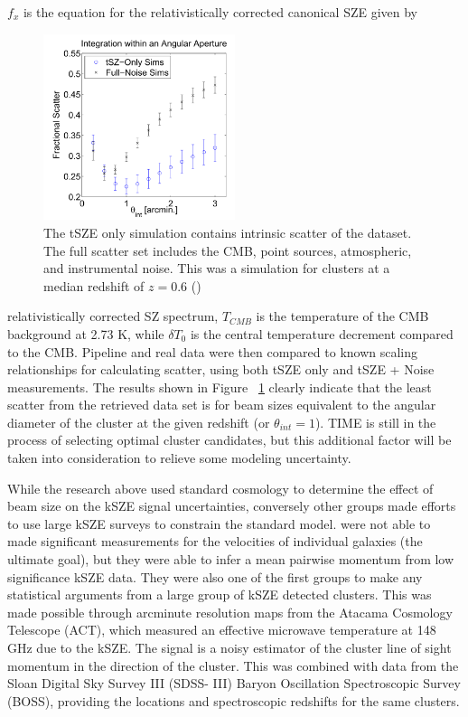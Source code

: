\documentclass[manuscript]{aastex}
\begin{document}
$f_{x}$ is the equation for the relativistically corrected canonical SZE given by 
\begin{figure}
\vspace{-0.8cm}
  \begin{center}
    \includegraphics[width=0.5\textwidth]{saliwanchick1.png}
   \end{center}
\caption[MCMC Cluster Simulation Showing Scatter Versus Integration Angle -(\cite{Saliwanchik2015})]{The tSZE only simulation contains intrinsic scatter of the dataset. The full scatter set includes the CMB, point sources, atmospheric, and instrumental noise. This was a simulation for clusters at a median redshift of $z = 0.6$ (\cite{Saliwanchik2015})}
\label{fig:sali1}
\end{figure}
relativistically corrected SZ spectrum, $T_{CMB}$ is the temperature of the CMB background at 2.73 K, while $\delta T_{0}$ is the central temperature decrement compared to the CMB. Pipeline and real data were then compared to known scaling relationships for calculating scatter, using both tSZE only and tSZE + Noise measurements. The results shown in Figure ~\ref{fig:sali1} clearly indicate that the least scatter from the retrieved data set is for beam sizes equivalent to the angular diameter of the cluster at the given redshift (or \(\theta_{int} = 1\)). TIME is still in the process of selecting optimal cluster candidates, but this additional factor will be taken into consideration to relieve some modeling uncertainty.  

While the research above used standard cosmology to determine the effect of beam size on the kSZE signal uncertainties, conversely other groups made efforts to use large kSZE surveys to constrain the standard model. \cite{Hand2012} were not able to made significant measurements for the velocities of individual galaxies (the ultimate goal), but they were able to infer a mean pairwise momentum from low significance kSZE data. They were also one of the first groups to make any statistical arguments from a large group of kSZE detected clusters. This was made possible through arcminute resolution maps from the Atacama Cosmology Telescope (ACT), which measured an effective microwave temperature at 148 GHz due to the kSZE. The signal is a noisy estimator of the cluster line of sight momentum in the direction of the cluster. This was combined with data from the Sloan Digital Sky Survey III (SDSS- III) Baryon Oscillation Spectroscopic Survey (BOSS), providing the locations and spectroscopic redshifts for the same clusters. 
\end{document}

